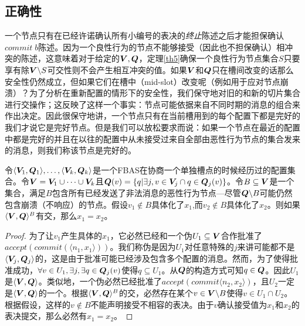 \subsection{正确性}\label{sec:scp_correct}

一个节点只有在已经许诺确认所有小编号的表决的\textit{终止}陈述之后才能担保确认$commit\;b$陈述。因为一个良性行为的节点不能够接受（因此也不担保确认）相冲突的陈述，这意味着对于给定的${\bm V},{\bm Q}$，定理\ref{th5}确保一个良性行为节点集合$S$只要享有除${\bm V}\backslash S${\quorum}可交性则不会产生相互冲突的值。如果${\bm V}$和${\bm Q}$只在槽间改变的话那么安全性仍然成立，但如果它们在槽中（mid-slot）改变呢（例如用于应对节点崩溃）？为了分析在重新配置的情形下的安全性，我们保守地对旧的和新的{\quorum}切片集合进行交操作；这反映了这样一个事实：节点可能依据来自不同时期的消息的组合来作出决定。因此很保守地讲，一个节点只有在当前槽用到的每个配置下都是完好的我们才说它是完好节点。但是我们可以放松要求而说：如果一个节点在最近的配置中都是完好的并且在以往的配置中从未接受过来自全部由恶性行为节点的{\vblock}集合发来的消息，则我们称该节点是完好的。

\begin{theorem}\label{th12}
        令$\langle {\bm V_1},{\bm Q_1}\rangle,\ldots,\langle {\bm V_k},{\bm Q_k}\rangle$是一个FBAS在协商一个单独槽点的时候经历过的配置集合。令${\bm V}={\bm V_1}\cup \cdots\cup {\bm V_k}$且${\bm Q}(v)=\left\{q|\exists j, v\in{\bm V_j}\cap q\in{\bm Q}_j(v)\right\}$。令$B\subseteq{\bm V}$是一个集合，满足$B$包含所有已经发送了非法消息的恶性行为节点---尽管${\bm Q}\backslash B$可能仍然包含崩溃（不响应）的节点。假设$v_1\not\in B$具体化了$x_1$,而$v_2\not\in B$具体化了$x_2$。则如果$\langle{\bm V},{\bm Q}\rangle^{B}$有{\quorum}交，那么$x_1=x_2$。
\end{theorem}

\begin{proof}
        为了让$v_1$产生具体的$x_1$，它必然已经和一个伪{\quorum}$U_1\subseteq{\bm V}$合作批准了$accept(commit(\langle n_1,x_1\rangle))$。我们称伪{\quorum}是因为$U_1$对任意特殊的$j$来讲可能都不是$\langle{\bm V}_j,{\bm Q}_j\rangle$的{\quorum}，这是由于批准可能已经涉及包含多个配置的消息。然而，为了使得批准成功，$\forall v\in U_1,\exists j, \exists q\in{\bm Q}_j(v)$使得$q\subseteq U_1$。从${\bm Q}$的构造方式可知$q\in{\bm Q}$。因此$U_1$是$\langle{\bm V},{\bm Q}\rangle$。类似地，一个伪{\quorum}必然已经批准了$accept(commit\langle n_2,x_2\rangle)$，且$U_2$一定是$\langle{\bm V},{\bm Q}\rangle$的一个{\quorum}。根据$\langle{\bm V},{\bm Q}\rangle^{B}$的{\quorum}交，必然存在某个$v\in {\bm V}\backslash B$使得$v\in U_1\cap U_2$。根据假设，这样的$v\not\in B$不能声明接受不相容的表决。由于$v$确认接受值为$x_1$和$x_2$的表决提交，那么必然有$x_1=x_2$。
\end{proof}

